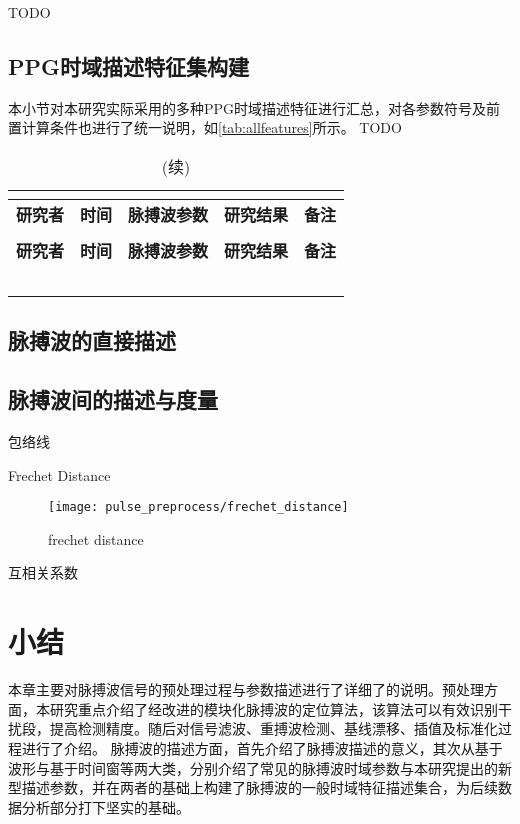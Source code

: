 TODO

\subsection{PPG时域描述特征集构建}
本小节对本研究实际采用的多种PPG时域描述特征进行汇总，对各参数符号及前置计算条件也进行了统一说明，如\autoref{tab:allfeatures}所示。
TODO
\begin{center}
    \fontsize{10}{4}
	\begin{longtable}{p{3cm}<{\centering}p{1cm}<{\centering}p{2cm}<{\centering}p{6cm}<{\centering}p{1cm}<{\centering}}
		\caption{本研究使用的所有PPG时域指标一览}\\
		\label{tab:allfeatures}\\
		\hline\hline
            \textbf{研究者}&\textbf{时间}&\textbf{脉搏波参数}&\textbf{研究结果}&\textbf{备注}\\
        \hline
        \endfirsthead
        \caption[]{(续)}\\
        \hline
            \textbf{研究者}&\textbf{时间}&\textbf{脉搏波参数}&\textbf{研究结果}&\textbf{备注}\\
        \hline
        \endhead 
        \hline
        \endfoot
        \hline\hline
        \endlastfoot
        &       &       &       &  \\
        &       &       &       &  \\
        &       &       &       &  \\
        &       &       &       &  \\
        &       &       &       &  \\
	\end{longtable}
\end{center}
\subsection{脉搏波的直接描述}
\subsection{脉搏波间的描述与度量}
包络线

Frechet Distance

\begin{figure}[htbp]
    \centering
    \texttt{[image: pulse\_preprocess/frechet\_distance]}
    \caption{\label{fig:frechet distance}frechet distance}
\end{figure}

互相关系数
\section{小结}
本章主要对脉搏波信号的预处理过程与参数描述进行了详细了的说明。预处理方面，本研究重点介绍了经改进的模块化脉搏波的定位算法，该算法可以有效识别干扰段，提高检测精度。随后对信号滤波、重搏波检测、基线漂移、插值及标准化过程进行了介绍。
脉搏波的描述方面，首先介绍了脉搏波描述的意义，其次从基于波形与基于时间窗等两大类，分别介绍了常见的脉搏波时域参数与本研究提出的新型描述参数，并在两者的基础上构建了脉搏波的一般时域特征描述集合，为后续数据分析部分打下坚实的基础。